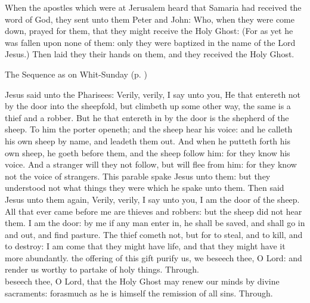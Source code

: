  When the apostles which were at Jerusalem heard that Samaria had received the word of God, they sent unto them Peter and John: Who, when they were come down, prayed for them, that they might receive the Holy Ghost: (For as yet he was fallen upon none of them: only they were baptized in the name of the Lord Jesus.) Then laid they their hands on them, and they received the Holy Ghost.
\begin{rubric}
{The Sequence as on Whit-Sunday (p. \pageref{WhitSeq})}
\end{rubric}
 Jesus said unto the Pharisees: Verily, verily, I say unto you, He that entereth not by the door into the sheepfold, but climbeth up some other way, the same is a thief and a robber. But he that entereth in by the door is the shepherd of the sheep. To him the porter openeth; and the sheep hear his voice: and he calleth his own sheep by name, and leadeth them out. And when he putteth forth his own sheep, he goeth before them, and the sheep follow him: for they know his voice. And a stranger will they not follow, but will flee from him: for they know not the voice of strangers. This parable spake Jesus unto them: but they understood not what things they were which he spake unto them. Then said Jesus unto them again, Verily, verily, I say unto you, I am the door of the sheep. All that ever came before me are thieves and robbers: but the sheep did not hear them. I am the door: by me if any man enter in, he shall be saved, and shall go in and out, and find pasture. The thief cometh not, but for to steal, and to kill, and to destroy: I am come that they might have life, and that they might have it more abundantly.
\secret
{} the offering of this gift purify us, we beseech thee, O Lord: and render us worthy to partake of holy things. Through.\\

\postcommunion
{} beseech thee, O Lord, that the Holy Ghost may renew our minds by divine sacraments: forasmuch as he is himself the remission of all sins. Through.

